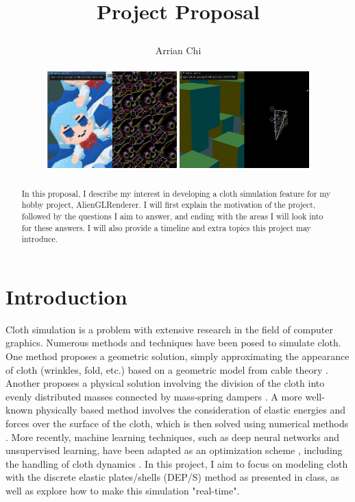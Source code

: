 \documentclass[letterpaper, 10 pt, conference, english]{ieeeconf}  %
\title{\LARGE \bf
Project Proposal

}
\author{Arrian Chi%
\\ 
\\
\includegraphics[width=5cm]{fumo.png} \> \includegraphics[width=5cm]{output.png} 
}
\begin{document}



\maketitle


\thispagestyle{empty}
\pagestyle{empty}






\begin{abstract}
In this proposal, I describe my interest in developing a cloth simulation feature for my hobby project, AlienGLRenderer. I will first explain the motivation of the project, followed by the questions I aim to answer, and ending with the areas I will look into for these answers. I will also provide a timeline and extra topics this project may introduce. 

\end{abstract}
\section{Introduction}
Cloth simulation is a problem with extensive research in the field of computer graphics. Numerous methods and techniques have been posed to simulate cloth. One method proposes a geometric solution, simply approximating the appearance of cloth (wrinkles, fold, etc.) based on a geometric model from cable theory \cite{weil1986synthesis}. Another proposes a physical solution involving the division of the cloth into evenly distributed masses connected by mass-spring dampers \cite{provot1995deformation}. A more well-known physically based method involves the consideration of elastic energies \cite{terzopoulos1987elastically} and forces over the surface of the cloth, which is then solved using numerical methods \cite{baraff1998large}. More recently, machine learning techniques, such as deep neural networks and unsupervised learning, have been adapted as an optimization scheme \cite{oh2018hierarchical}, including the handling of cloth dynamics \cite{bertiche2022neural}. In this project, I aim to focus on modeling cloth with the discrete elastic plates/shells (DEP/S) method as presented in class, as well as explore how to make this simulation "real-time".
\end{document}

